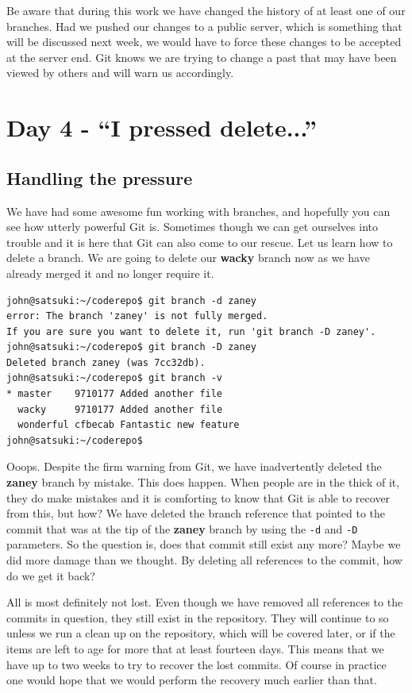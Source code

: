 Be aware that during this work we have changed the history of at least one of our branches.
Had we pushed our changes to a public server, which is something that will be discussed next week, we would have to force these changes to be accepted at the server end.
Git knows we are trying to change a past that may have been viewed by others and will warn us accordingly.

\section{Day 4 - ``I pressed delete...''}
\subsection{Handling the pressure}

We have had some awesome fun working with branches, and hopefully you can see how utterly powerful Git is.
Sometimes though we can get ourselves into trouble and it is here that Git can also come to our rescue.
Let us learn how to delete a branch.
We are going to delete our \textbf{wacky} branch now as we have already merged it and no longer require it.

\begin{Verbatim}
john@satsuki:~/coderepo$ git branch -d zaney
error: The branch 'zaney' is not fully merged.
If you are sure you want to delete it, run 'git branch -D zaney'.
john@satsuki:~/coderepo$ git branch -D zaney
Deleted branch zaney (was 7cc32db).
john@satsuki:~/coderepo$ git branch -v
* master    9710177 Added another file
  wacky     9710177 Added another file
  wonderful cfbecab Fantastic new feature
john@satsuki:~/coderepo$
\end{Verbatim}

Ooops.
Despite the firm warning from Git, we have inadvertently deleted the \textbf{zaney} branch by mistake.
This does happen.
When people are in the thick of it, they do make mistakes and it is comforting to know that Git is able to recover from this, but how?  We have deleted the branch reference that pointed to the commit that was at the tip of the \textbf{zaney} branch by using the \texttt{-d} and \texttt{-D} parameters.
So the question is, does that commit still exist any more?  Maybe we did more damage than we thought.
By deleting all references to the commit, how do we get it back?

All is most definitely not lost.
Even though we have removed all references to the commits in question, they still exist in the repository.
They will continue to so unless we run a clean up on the repository, which will be covered later, or if the items are left to age for more that at least fourteen days.
This means that we have up to two weeks to try to recover the lost commits.
Of course in practice one would hope that we would perform the recovery much earlier than that.

